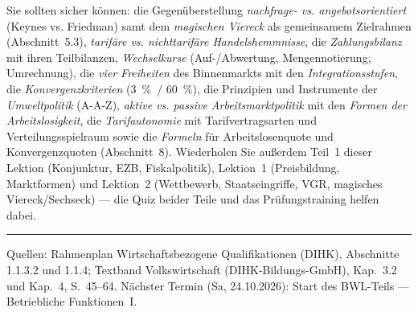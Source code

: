 \documentclass[11pt, a4paper]{article}
\begin{document}
\begin{merksatz}[title={\bfseries Wichtig für die Prüfungsvorbereitung (Block 1.1 komplett)}]
Sie sollten sicher können: die Gegenüberstellung \emph{nachfrage- vs. angebotsorientiert}
(Keynes vs. Friedman) samt dem \emph{magischen Viereck} als gemeinsamem Zielrahmen
(Abschnitt~5.3), \emph{tarifäre vs. nichttarifäre Handelshemmnisse}, die
\emph{Zahlungsbilanz} mit ihren Teilbilanzen, \emph{Wechselkurse} (Auf-/Abwertung,
Mengennotierung, Umrechnung), die \emph{vier Freiheiten} des Binnenmarkts mit den
\emph{Integrationsstufen}, die \emph{Konvergenzkriterien} (3~\%~/ 60~\%), die
Prinzipien und Instrumente der \emph{Umweltpolitik} (A-A-Z), \emph{aktive vs. passive
Arbeitsmarktpolitik} mit den \emph{Formen der Arbeitslosigkeit}, die
\emph{Tarifautonomie} mit Tarifvertragsarten und Verteilungsspielraum sowie die
\emph{Formeln} für Arbeitslosenquote und Konvergenzquoten (Abschnitt~8). Wiederholen Sie
außerdem Teil~1 dieser Lektion (Konjunktur, EZB, Fiskalpolitik),
Lektion~1 (Preisbildung, Marktformen) und Lektion~2 (Wettbewerb, Staatseingriffe, VGR,
magisches Viereck/Sechseck) --- die Quiz beider Teile und das Prüfungstraining helfen dabei.
\end{merksatz}

\vspace{1em}
\hrule
\vspace{0.8em}
\noindent\textsf{\small Quellen: Rahmenplan Wirtschaftsbezogene Qualifikationen (DIHK), Abschnitte 1.1.3.2 und 1.1.4;
Textband Volkswirtschaft (DIHK-Bildungs-GmbH), Kap.~3.2 und Kap.~4, S.~45--64. Nächster Termin (Sa, 24.10.2026):
Start des BWL-Teils --- Betriebliche Funktionen~I.}
\end{document}
